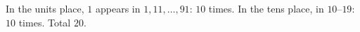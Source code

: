 In the units place, $1$ appears in $1,11,\dots,91$: $10$ times. In the tens place, in $10$--$19$: $10$ times. Total $\boxed{20}$.
